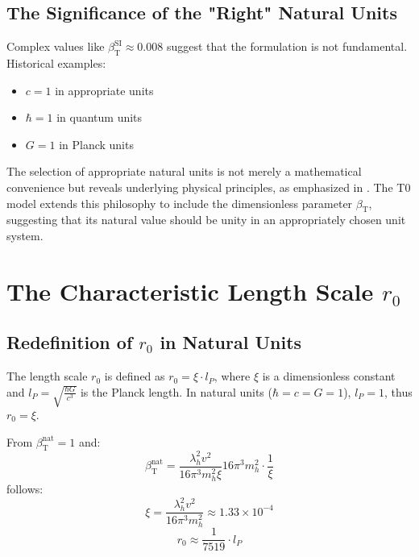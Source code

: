 \documentclass[12pt,a4paper]{article}
\newcommand{\betaT}{\beta_{\text{T}}}
\begin{document}
	\subsection{The Significance of the "Right" Natural Units}
	\label{subsec:right_natural_units}
	
	Complex values like \(\betaT^{\text{SI}} \approx 0.008\) suggest that the formulation is not fundamental. Historical examples:
	\begin{itemize}
		\item \(c = 1\) in appropriate units
		\item \(\hbar = 1\) in quantum units
		\item \(G = 1\) in Planck units
	\end{itemize}
	
	The selection of appropriate natural units is not merely a mathematical convenience but reveals underlying physical principles, as emphasized in \cite{pascher_zeit_masse_2025}. The T0 model extends this philosophy to include the dimensionless parameter \(\betaT\), suggesting that its natural value should be unity in an appropriately chosen unit system.
	
	\section{The Characteristic Length Scale \(r_0\)}
	\label{sec:length_scale}
	
	\subsection{Redefinition of \(r_0\) in Natural Units}
	\label{subsec:r0_redefinition}
	
	The length scale \(r_0\) is defined as \(r_0 = \xi \cdot l_P\), where \(\xi\) is a dimensionless constant and \(l_P = \sqrt{\frac{\hbar G}{c^3}}\) is the Planck length. In natural units (\(\hbar = c = G = 1\)), \(l_P = 1\), thus \(r_0 = \xi\).
	
	From \(\betaT^{\text{nat}} = 1\) and:
	\begin{equation}
		\betaT^{\text{nat}} = \frac{\lambda_h^2 v^2}{16\pi^3 m_h^2 \xi}{16\pi^3 m_h^2} \cdot \frac{1}{\xi}
	\end{equation}
	follows:
	\begin{equation}
		\xi = \frac{\lambda_h^2 v^2}{16\pi^3 m_h^2} \approx 1.33 \times 10^{-4}
	\end{equation}
	\begin{equation}
		r_0 \approx \frac{1}{7519} \cdot l_P
	\end{equation}
	
\end{document}
